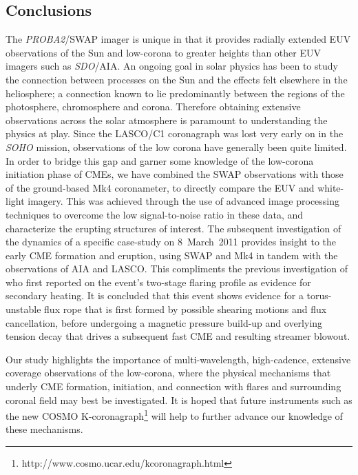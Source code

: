 \documentclass[namedreferences]{solarphysics}
\begin{document}
\begin{article}
{\section{Conclusions}
\label{sect:conclusions}

The \emph{PROBA2}/SWAP imager is unique in that it provides radially extended EUV observations of the Sun and low-corona to greater heights than other EUV imagers such as \emph{SDO}/AIA. An ongoing goal in solar physics has been to study the connection between processes on the Sun and the effects felt elsewhere in the heliosphere; a connection known to lie predominantly between the regions of the photosphere, chromosphere and corona. Therefore obtaining extensive observations across the solar atmosphere is paramount to understanding the physics at play. Since the LASCO/C1 coronagraph was lost very early on in the \emph{SOHO} mission, observations of the low corona have generally been quite limited. In order to bridge this gap and garner some knowledge of the low-corona initiation phase of CMEs, we have combined the SWAP observations with those of the ground-based Mk4 coronameter, to directly compare the EUV and white-light imagery. This was achieved through the use of advanced image processing techniques to overcome the low signal-to-noise ratio in these data, and characterize the erupting structures of interest. The subsequent investigation of the dynamics of a specific case-study on 8~March~2011 provides insight to the early CME formation and eruption, using SWAP and Mk4 in tandem with the observations of AIA and LASCO. This compliments the previous investigation of  who first reported on the event's two-stage flaring profile as evidence for secondary heating. It is concluded that this event shows evidence for a torus-unstable flux rope that is first formed by possible shearing motions and flux cancellation, before undergoing a magnetic pressure build-up and overlying tension decay that drives a subsequent fast CME and resulting streamer blowout. 

Our study highlights the importance of multi-wavelength, high-cadence, extensive coverage observations of the low-corona, where the physical mechanisms that underly CME formation, initiation, and connection with flares and surrounding coronal field may best be investigated. It is hoped that future instruments such as the new COSMO K-coronagraph\footnote{http://www.cosmo.ucar.edu/kcoronagraph.html} will help to further advance our knowledge of these mechanisms.

}
\end{article}
\end{document}
